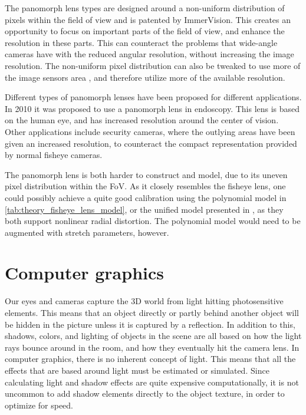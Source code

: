 The panomorph lens types are designed around a non-uniform distribution of pixels within the field of view and is patented by ImmerVision. This creates an opportunity to focus on important parts of the field of view, and enhance the resolution in these parts. This can counteract the problems that wide-angle cameras have with the reduced angular resolution, without increasing the image resolution. The non-uniform pixel distribution can also be tweaked to use more of the image sensors area \cite{PanomorphLowCostSurvailance}, and therefore utilize more of the available resolution.

Different types of panomorph lenses have been proposed for different applications. In 2010 it was proposed to use a panomorph lens in endoscopy\cite{endoscopypano}. This lens is based on the human eye, and has increased resolution around the center of vision. Other applications include security cameras\cite{PanomorphEnhancesSurvailance}, where the outlying areas have been given an increased resolution, to counteract the compact representation provided by normal fisheye cameras.

The panomorph lens is both harder to construct and model, due to its uneven pixel distribution within the FoV. As it closely resembles the fisheye lens, one could possibly achieve a quite good calibration using the polynomial model in \ref{tab:theory_fisheye_lens_model}, or the unified model presented in \cite{FisheyeKalibration}, as they both support nonlinear radial distortion. The polynomial model would need to be augmented with stretch parameters, however.

\section{Computer graphics}

Our eyes and cameras capture the 3D world from light hitting photosensitive elements. This means that an object directly or partly behind another object will be hidden in the picture unless it is captured by a reflection. In addition to this, shadows, colors, and lighting of objects in the scene are all based on how the light rays bounce around in the room, and how they eventually hit the camera lens. In computer graphics, there is no inherent concept of light. This means that all the effects that are based around light must be estimated or simulated. Since calculating light and shadow effects are quite expensive computationally, it is not uncommon to add shadow elements directly to the object texture, in order to optimize for speed.

